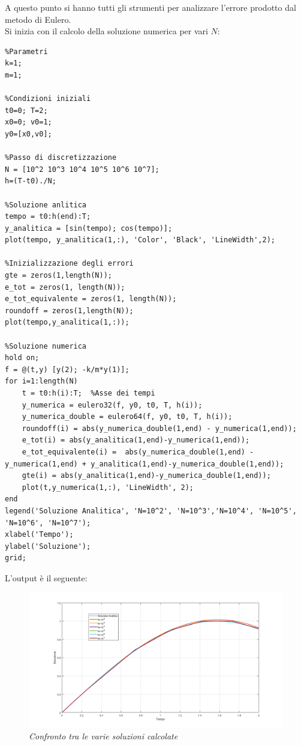A questo punto si hanno tutti gli strumenti per analizzare l'errore prodotto dal metodo di Eulero.
\\Si inizia con il calcolo della soluzione numerica per vari $N$:
\begin{verbatim}
%Parametri
k=1;
m=1;

%Condizioni iniziali
t0=0; T=2;
x0=0; v0=1;
y0=[x0,v0];

%Passo di discretizzazione
N = [10^2 10^3 10^4 10^5 10^6 10^7];
h=(T-t0)./N;

%Soluzione anlitica
tempo = t0:h(end):T;
y_analitica = [sin(tempo); cos(tempo)];
plot(tempo, y_analitica(1,:), 'Color', 'Black', 'LineWidth',2);

%Inizializzazione degli errori
gte = zeros(1,length(N));
e_tot = zeros(1, length(N));
e_tot_equivalente = zeros(1, length(N));
roundoff = zeros(1,length(N));
plot(tempo,y_analitica(1,:));

%Soluzione numerica
hold on;
f = @(t,y) [y(2); -k/m*y(1)]; 
for i=1:length(N)
	t = t0:h(i):T;  %Asse dei tempi
	y_numerica = eulero32(f, y0, t0, T, h(i));
	y_numerica_double = eulero64(f, y0, t0, T, h(i));
	roundoff(i) = abs(y_numerica_double(1,end) - y_numerica(1,end));
	e_tot(i) = abs(y_analitica(1,end)-y_numerica(1,end));
	e_tot_equivalente(i) =  abs(y_numerica_double(1,end) - y_numerica(1,end) + y_analitica(1,end)-y_numerica_double(1,end));
	gte(i) = abs(y_analitica(1,end)-y_numerica_double(1,end));
	plot(t,y_numerica(1,:), 'LineWidth', 2);
end
legend('Soluzione Analitica', 'N=10^2', 'N=10^3','N=10^4', 'N=10^5', 'N=10^6', 'N=10^7');
xlabel('Tempo');
ylabel('Soluzione');
grid;
\end{verbatim}
L'output è il seguente:
\begin{figure}[H]
	\centering   
	\includegraphics[width=\textwidth]{matlab/esercizio2_soluzioni.png}
	\caption{\textit{Confronto tra le varie soluzioni calcolate}}
\end{figure}
